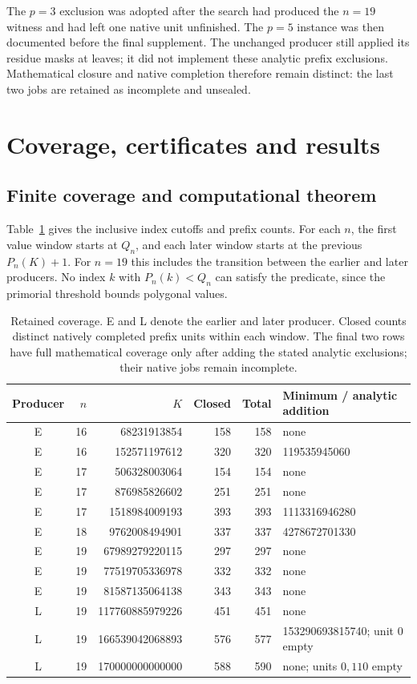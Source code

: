 \documentclass[11pt]{article}
\theoremstyle{remark}
\begin{document}
The $p=3$ exclusion was adopted after the search had produced the $n=19$
witness and had left one native unit unfinished. The $p=5$ instance was
then documented before the final supplement. The unchanged producer still
applied its residue masks at leaves; it did not implement these analytic
prefix exclusions. Mathematical closure and native completion therefore
remain distinct: the last two jobs are retained as incomplete and unsealed.

\section{Coverage, certificates and results}\label{sec:results}
\subsection{Finite coverage and computational theorem}
Table~\ref{tab:windows} gives the inclusive index cutoffs and prefix counts.
For each $n$, the first value window starts at $Q_n$, and each later window
starts at the previous $P_n(K)+1$. For $n=19$ this includes the transition
between the earlier and later producers. No index $k$ with $P_n(k)<Q_n$ can satisfy the predicate, since the
primorial threshold bounds polygonal values.

\begin{table}[htbp]
\centering
\small
\begin{tabular}{crrrrl}
\toprule
Producer & $n$ & $K$ & Closed & Total & Minimum / analytic addition\\
\midrule
E & 16 & 68231913854 & 158 & 158 & none\\
E & 16 & 152571197612 & 320 & 320 & 119535945060\\
E & 17 & 506328003064 & 154 & 154 & none\\
E & 17 & 876985826602 & 251 & 251 & none\\
E & 17 & 1518984009193 & 393 & 393 & 1113316946280\\
E & 18 & 9762008494901 & 337 & 337 & 4278672701330\\
\midrule
E & 19 & 67989279220115 & 297 & 297 & none\\
E & 19 & 77519705336978 & 332 & 332 & none\\
E & 19 & 81587135064138 & 343 & 343 & none\\
L & 19 & 117760885979226 & 451 & 451 & none\\
L & 19 & 166539042068893 & 576 & 577 & 153290693815740; unit $0$ empty\\
L & 19 & 170000000000000 & 588 & 590 & none; units $0,110$ empty\\
\bottomrule
\end{tabular}
\caption{Retained coverage. E and L denote the earlier and later producer.
Closed counts distinct natively completed prefix units within each window. The final two rows have full mathematical coverage only after
adding the stated analytic exclusions; their native jobs remain incomplete.}
\label{tab:windows}
\end{table}
\end{document}
